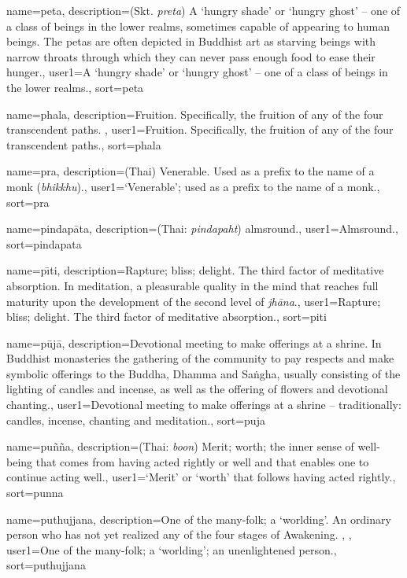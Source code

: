 {
name={peta},
description={(Skt. \textit{preta}) A `hungry shade' or `hungry ghost' -- one of a class of beings in the lower realms, sometimes capable of appearing to human beings. The petas are often depicted in Buddhist art as starving beings with narrow throats through which they can never pass enough food to ease their hunger.},
user1={A `hungry shade' or `hungry ghost' -- one of a class of beings in the lower realms.},
sort={peta}
}

{
name={phala},
description={Fruition. Specifically, the fruition of any of the four transcendent paths. \protect \seepre %
\protect {}%
\protect \seepost %
},
user1={Fruition. Specifically, the fruition of any of the four transcendent paths.},
sort={phala}
}

{
name={pra},
description={(Thai) Venerable. Used as a prefix to the name of a monk (\textit{bhikkhu}).},
user1={`Venerable'; used as a prefix to the name of a monk.},
sort={pra}
}

{
name=pindap\=ata,
description={(Thai: \textit{pindapaht}) almsround.},
user1={Almsround.},
sort={pindapata}
}

{
name={p\={\i}ti},
description={Rapture; bliss; delight. The third factor of meditative absorption. In meditation, a pleasurable quality in the mind that reaches full maturity upon the development of the second level of \textit{jh\=ana}.},
user1={Rapture; bliss; delight. The third factor of meditative absorption.},
sort={piti}
}

{
name=p\=uj\=a,
description={Devotional meeting to make offerings at a shrine. In Buddhist monasteries the gathering of the community to pay respects and make symbolic offerings to the Buddha, Dhamma and Sa\.ngha, usually consisting of the lighting of candles and incense, as well as the offering of flowers and devotional chanting.},
user1={Devotional meeting to make offerings at a shrine -- traditionally: candles, incense, chanting and meditation.},
sort={puja}
}

{
name={pu\~n\~na},
description={(Thai: \textit{boon}) Merit; worth; the inner sense of well-being that comes from having acted rightly or well and that enables one to continue acting well.},
user1={`Merit' or `worth' that follows having acted rightly.},
sort={punna}
}

{
name={puthujjana},
description={One of the many-folk; a `worlding'. An ordinary person who has not yet realized any of the four stages of Awakening. \protect \seepre %
\protect {}, \protect {}%
\protect \seepost %
},
user1={One of the many-folk; a `worlding'; an unenlightened person.},
sort={puthujjana}
}

